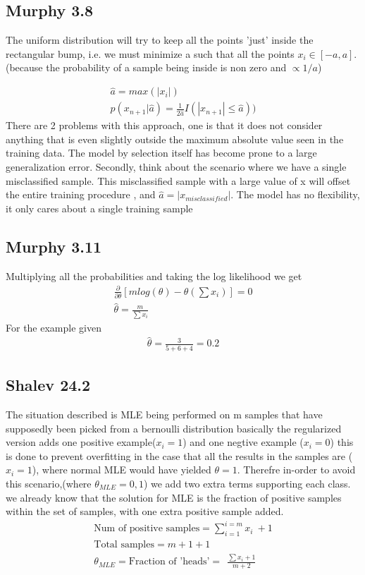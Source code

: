 \subsection{Murphy 3.8}
The uniform distribution will try to keep all the points 'just' inside the rectangular bump, 
i.e. we must minimize a  such that all the points $x_i \in [-a , a]$.(because the probability of a sample being inside is non zero and $\propto 1/a$)

\begin{gather}
    \hat{a} = max (|x_i|) \\
    p(x_{n + 1} | \hat{a}) = \frac{1}{2\hat{a}} I(|x_{n+1}| \le \hat{a}))
\end{gather}  
There are 2 problems with this approach, one is that it does not consider anything that is even slightly outside the 
maximum absolute value seen in the training data. The model by selection itself has become prone
to a large generalization error.
Secondly, think about the scenario where we have a single misclassified sample. This misclassified sample with a large value of x
will offset the entire training procedure , and $\hat{a} = |x_{misclassified}|$. The model has no flexibility, it only cares about a single training sample

\subsection{Murphy 3.11}
Multiplying all the probabilities and taking the log likelihood we get 
\begin{gather}
    \frac{\partial }{\partial \theta}[ m log (\theta)  - \theta (\sum x_i)] = 0
    \\
    \hat{\theta} = \frac{m}{\sum x_i}
\end{gather}
For the example given 
\begin{gather}
    \hat{\theta} = \frac{3}{5 + 6 + 4} = 0.2
\end{gather}

\subsection{Shalev 24.2}
The situation described is MLE being performed on m samples that have supposedly been picked from a bernoulli distribution
basically the regularized version adds one positive example($x_i = 1$) and one negtive example ($x_i = 0$) this is done to prevent overfitting in the case that
all the results in the samples are ($x_i = 1$), where normal MLE would have yielded $\theta = 1$. Therefre in-order to avoid this scenario,(where $\theta_{MLE}  = 0 , 1$)
we add two extra terms supporting each class.
we already know that the solution for MLE is the fraction of positive samples within the set of samples, with one extra positive sample added.
\begin{gather*}
    \text{Num of positive samples} = \sum_{i = 1}^{i = m} x_i  \ +  1 \\
    \text{Total samples} = m + 1 + 1 \\
    \theta_{MLE} = \text{Fraction of 'heads'}   =  \ \ \frac{\sum {x_i} + 1}{m + 2} \\
\end{gather*}

